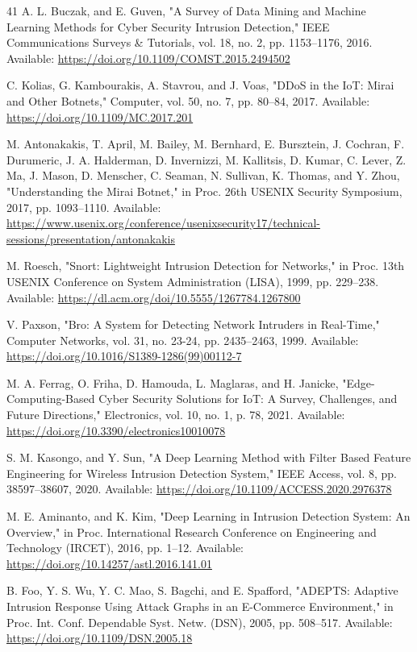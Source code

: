 \documentclass[journal,10pt,onecolumn]{IEEEtran}
\begin{document}
\begin{thebibliography}{41}
 A. L. Buczak, and E. Guven, "A Survey of Data Mining and Machine Learning Methods for Cyber Security Intrusion Detection," IEEE Communications Surveys & Tutorials, vol. 18, no. 2, pp. 1153–1176, 2016. Available: \url{https://doi.org/10.1109/COMST.2015.2494502}

 C. Kolias, G. Kambourakis, A. Stavrou, and J. Voas, "DDoS in the IoT: Mirai and Other Botnets," Computer, vol. 50, no. 7, pp. 80–84, 2017. Available: \url{https://doi.org/10.1109/MC.2017.201}

 M. Antonakakis, T. April, M. Bailey, M. Bernhard, E. Bursztein, J. Cochran, F. Durumeric, J. A. Halderman, D. Invernizzi, M. Kallitsis, D. Kumar, C. Lever, Z. Ma, J. Mason, D. Menscher, C. Seaman, N. Sullivan, K. Thomas, and Y. Zhou, "Understanding the Mirai Botnet," in Proc. 26th USENIX Security Symposium, 2017, pp. 1093–1110. Available: \url{https://www.usenix.org/conference/usenixsecurity17/technical-sessions/presentation/antonakakis}

 M. Roesch, "Snort: Lightweight Intrusion Detection for Networks," in Proc. 13th USENIX Conference on System Administration (LISA), 1999, pp. 229–238. Available: \url{https://dl.acm.org/doi/10.5555/1267784.1267800}

 V. Paxson, "Bro: A System for Detecting Network Intruders in Real-Time," Computer Networks, vol. 31, no. 23-24, pp. 2435–2463, 1999. Available: \url{https://doi.org/10.1016/S1389-1286(99)00112-7}

 M. A. Ferrag, O. Friha, D. Hamouda, L. Maglaras, and H. Janicke, "Edge-Computing-Based Cyber Security Solutions for IoT: A Survey, Challenges, and Future Directions," Electronics, vol. 10, no. 1, p. 78, 2021. Available: \url{https://doi.org/10.3390/electronics10010078}

 S. M. Kasongo, and Y. Sun, "A Deep Learning Method with Filter Based Feature Engineering for Wireless Intrusion Detection System," IEEE Access, vol. 8, pp. 38597–38607, 2020. Available: \url{https://doi.org/10.1109/ACCESS.2020.2976378}

 M. E. Aminanto, and K. Kim, "Deep Learning in Intrusion Detection System: An Overview," in Proc. International Research Conference on Engineering and Technology (IRCET), 2016, pp. 1–12. Available: \url{https://doi.org/10.14257/astl.2016.141.01}

 B. Foo, Y. S. Wu, Y. C. Mao, S. Bagchi, and E. Spafford, "ADEPTS: Adaptive Intrusion Response Using Attack Graphs in an E-Commerce Environment," in Proc. Int. Conf. Dependable Syst. Netw. (DSN), 2005, pp. 508–517. Available: \url{https://doi.org/10.1109/DSN.2005.18}


\end{thebibliography}
\end{document}
